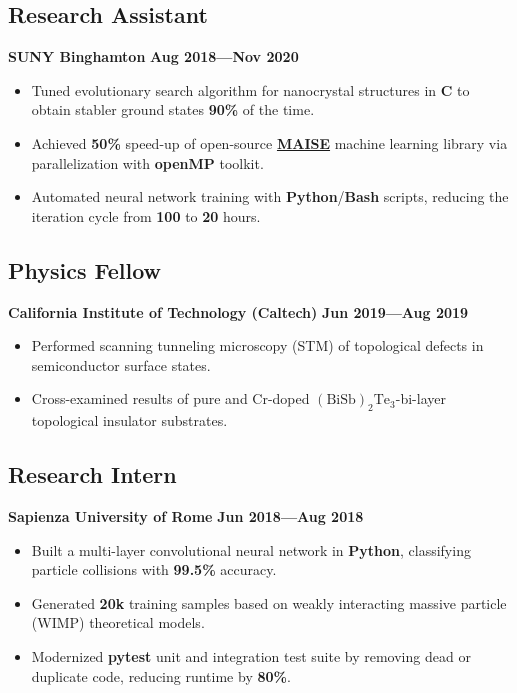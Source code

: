 \documentclass{article}
\newcommand{\subsubsectiontext}[1]{
    \hspace*{.5cm}%
    \begin{minipage}{.9\textwidth}%
    #1
    \end{minipage}%
}
\begin{document}
\subsection{Research Assistant} \hfill \textbf{SUNY Binghamton} \hfill \textbf{Aug 2018---Nov 2020}
\subsubsectiontext{
\begin{itemize}[leftmargin=0cm,nosep] 
    \item Tuned evolutionary search algorithm for nanocrystal structures in \textbf{C} to obtain stabler ground states \textbf{90\%} of the time. 
    \item Achieved \textbf{50\%} speed-up of open-source \href{https://maise.binghamton.edu/}{\textbf{MAISE}} machine learning library via parallelization with \textbf{openMP} toolkit.
    \item Automated neural network training with \textbf{Python}/\textbf{Bash} scripts, reducing the iteration cycle from \textbf{100} to \textbf{20} hours.

\end{itemize}
}


\subsection{Physics Fellow} \hfill \textbf{California Institute of Technology (Caltech)} \hfill \textbf{Jun 2019---Aug 2019}
\subsubsectiontext{
\begin{itemize}[leftmargin=0cm,nosep] 
    \item Performed scanning tunneling microscopy (STM) of topological defects in semiconductor surface states.
    \item  Cross-examined results of pure and Cr-doped $(\text{BiSb})_{2}\text{Te}_{3}$-bi-layer topological insulator substrates.
\end{itemize}
}


\subsection{Research Intern} \hfill \textbf{Sapienza University of Rome} \hfill \textbf{Jun 2018---Aug 2018}
\subsubsectiontext{
    \begin{itemize}[leftmargin=0cm,nosep] 
        \item Built a multi-layer convolutional neural network in \textbf{Python}, classifying particle collisions with \textbf{99.5\%} accuracy.
        \item Generated \textbf{20k} training samples based on weakly interacting massive particle (WIMP) theoretical models.
        \item Modernized \textbf{pytest} unit and integration test suite by removing dead or duplicate code, reducing runtime by \textbf{80\%}.
    \end{itemize}
}
\end{document}
